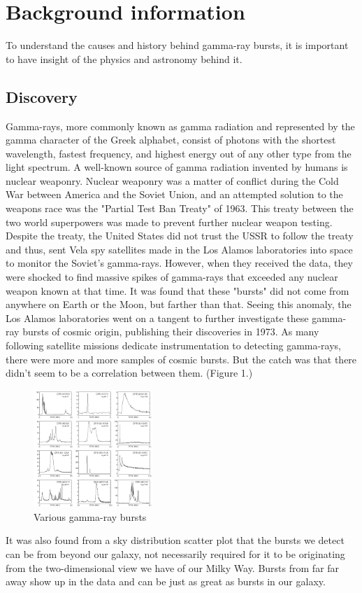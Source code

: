 \documentclass[final,5p,times,twocolumn,authoryear]{elsarticle}
\begin{document}
\section{Background information}
To understand the causes and history behind gamma-ray bursts, it is important to have insight of the physics and astronomy behind it.
\subsection{Discovery}
Gamma-rays, more commonly known as gamma radiation and represented by the gamma character of the Greek alphabet, consist of photons with the shortest wavelength, fastest frequency, and highest energy out of any other type from the light spectrum. A well-known source of gamma radiation invented by humans is nuclear weaponry. Nuclear weaponry was a matter of conflict during the Cold War between America and the Soviet Union, and an attempted solution to the weapons race was the "Partial Test Ban Treaty" of 1963. This treaty between the two world superpowers was made to prevent further nuclear weapon testing. Despite the treaty, the United States did not trust the USSR to follow the treaty and thus, sent Vela spy satellites made in the Los Alamos laboratories into space to monitor the Soviet's gamma-rays. However, when they received the data, they were shocked to find massive spikes of gamma-rays that exceeded any nuclear weapon known at that time. It was found that these "bursts" did not come from anywhere on Earth or the Moon, but farther than that. Seeing this anomaly, the Los Alamos laboratories went on a tangent to further investigate these gamma-ray bursts of cosmic origin, publishing their discoveries in 1973. \citep{history}
As many following satellite missions dedicate instrumentation to detecting gamma-rays, there were more and more samples of cosmic bursts. But the catch was that there didn't seem to be a correlation between them. (Figure 1.)
\begin{figure}[H]
	\centering 
	\includegraphics[width=0.4\textwidth]{images/GRB_BATSE_12lightcurves.png}	
	\caption{Various gamma-ray bursts} 
	\label{fig_mom0}%
\end{figure}
It was also found from a sky distribution scatter plot that the bursts we detect can be from beyond our galaxy, not necessarily required for it to be originating from the two-dimensional view we have of our Milky Way. Bursts from far far away show up in the data and can be just as great as bursts in our galaxy.
\end{document}
